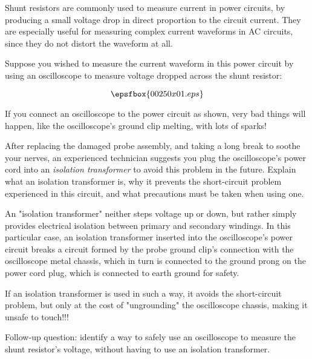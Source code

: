 

Shunt resistors are commonly used to measure current in power circuits, by producing a small voltage drop in direct proportion to the circuit current.  They are especially useful for measuring complex current waveforms in AC circuits, since they do not distort the waveform at all.

Suppose you wished to measure the current waveform in this power circuit by using an oscilloscope to measure voltage dropped across the shunt resistor:

$$\epsfbox{00250x01.eps}$$

If you connect an oscilloscope to the power circuit as shown, very bad things will happen, like the oscilloscope's ground clip melting, with lots of sparks!

After replacing the damaged probe assembly, and taking a long break to soothe your nerves, an experienced technician suggests you plug the oscilloscope's power cord into an {\it isolation transformer} to avoid this problem in the future.  Explain what an isolation transformer is, why it prevents the short-circuit problem experienced in this circuit, and what precautions must be taken when using one.







An "isolation transformer" neither steps voltage up or down, but rather simply provides electrical isolation between primary and secondary windings.  In this particular case, an isolation transformer inserted into the oscilloscope's power circuit breaks a circuit formed by the probe ground clip's connection with the oscilloscope metal chassis, which in turn is connected to the ground prong on the power cord plug, which is connected to earth ground for safety.

If an isolation transformer is used in such a way, it avoids the short-circuit problem, but only at the cost of "ungrounding" the oscilloscope chassis, making it unsafe to touch!!!

\vskip 10pt

Follow-up question: identify a way to safely use an oscilloscope to measure the shunt resistor's voltage, without having to use an isolation transformer.


